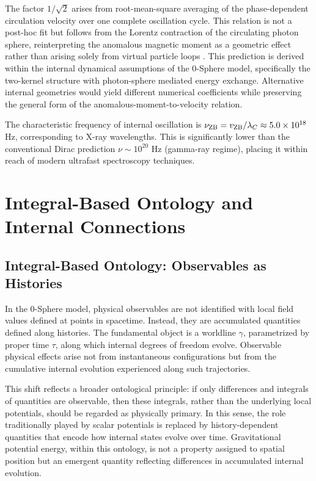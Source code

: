 \documentclass[%
 reprint,
 amsmath,amssymb,
 aps,
 prb,
]{revtex4-2}
\numberwithin{equation}{section}
\begin{document}
The factor $1/\sqrt{2}$ arises from root-mean-square averaging of the phase-dependent circulation velocity over one complete oscillation cycle. This relation is not a post-hoc fit but follows from the Lorentz contraction of the circulating photon sphere, reinterpreting the anomalous magnetic moment as a geometric effect rather than arising solely from virtual particle loops \cite{Hanamura2026Geometrical}. This prediction is derived within the internal dynamical assumptions of the 0-Sphere model, specifically the two-kernel structure with photon-sphere mediated energy exchange. Alternative internal geometries would yield different numerical coefficients while preserving the general form of the anomalous-moment-to-velocity relation.

The characteristic frequency of internal oscillation is $\nu_{\rm ZB} = v_{\rm ZB}/\lambda_C \approx 5.0 \times 10^{18}$ Hz, corresponding to X-ray wavelengths. This is significantly lower than the conventional Dirac prediction $\nu \sim 10^{20}$ Hz (gamma-ray regime), placing it within reach of modern ultrafast spectroscopy techniques.


\section{Integral-Based Ontology and Internal Connections}
\label{sec:integral_ontology}

\subsection{Integral-Based Ontology: Observables as Histories}

In the 0-Sphere model, physical observables are not identified with local field values defined at points in spacetime. Instead, they are accumulated quantities defined along histories. The fundamental object is a worldline $\gamma$, parametrized by proper time $\tau$, along which internal degrees of freedom evolve. Observable physical effects arise not from instantaneous configurations but from the cumulative internal evolution experienced along such trajectories.

This shift reflects a broader ontological principle: if only differences and integrals of quantities are observable, then these integrals, rather than the underlying local potentials, should be regarded as physically primary. In this sense, the role traditionally played by scalar potentials is replaced by history-dependent quantities that encode how internal states evolve over time. Gravitational potential energy, within this ontology, is not a property assigned to spatial position but an emergent quantity reflecting differences in accumulated internal evolution.
\end{document}
